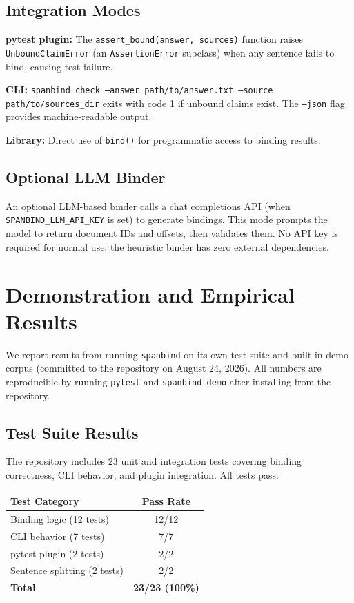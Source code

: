 \documentclass{article}
\begin{document}
\subsection{Integration Modes}

\textbf{pytest plugin:} The \texttt{assert\_bound(answer, sources)} function raises \texttt{UnboundClaimError} (an \texttt{AssertionError} subclass) when any sentence fails to bind, causing test failure.

\textbf{CLI:} \texttt{spanbind check --answer path/to/answer.txt --source path/to/sources\_dir} exits with code 1 if unbound claims exist. The \texttt{--json} flag provides machine-readable output.

\textbf{Library:} Direct use of \texttt{bind()} for programmatic access to binding results.

\subsection{Optional LLM Binder}

An optional LLM-based binder calls a chat completions API (when \texttt{SPANBIND\_LLM\_API\_KEY} is set) to generate bindings. This mode prompts the model to return document IDs and offsets, then validates them. No API key is required for normal use; the heuristic binder has zero external dependencies.

\section{Demonstration and Empirical Results}

We report results from running \texttt{spanbind} on its own test suite and built-in demo corpus (committed to the repository on August 24, 2026). All numbers are reproducible by running \texttt{pytest} and \texttt{spanbind demo} after installing from the repository.

\subsection{Test Suite Results}

The repository includes 23 unit and integration tests covering binding correctness, CLI behavior, and plugin integration. All tests pass:

\begin{center}
\begin{tabular}{lc}
\toprule
Test Category & Pass Rate \\
\midrule
Binding logic (12 tests) & 12/12 \\
CLI behavior (7 tests) & 7/7 \\
pytest plugin (2 tests) & 2/2 \\
Sentence splitting (2 tests) & 2/2 \\
\midrule
\textbf{Total} & \textbf{23/23 (100\%)} \\
\bottomrule
\end{tabular}
\end{center}
\end{document}
